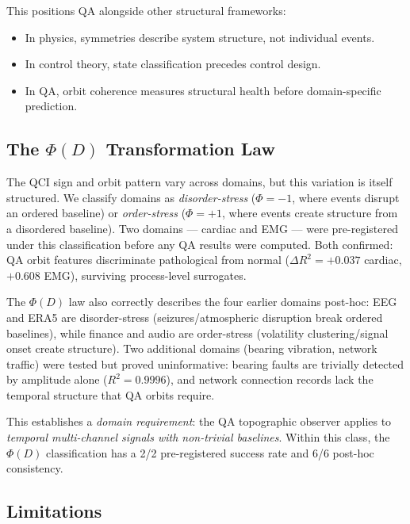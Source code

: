 \documentclass[11pt,a4paper]{article}
\begin{document}
This positions QA alongside other structural frameworks:
\begin{itemize}
  \item In physics, symmetries describe system structure, not individual events.
  \item In control theory, state classification precedes control design.
  \item In QA, orbit coherence measures structural health before
    domain-specific prediction.
\end{itemize}

\subsection{The $\Phi(D)$ Transformation Law}

The QCI sign and orbit pattern vary across domains, but this variation
is itself structured. We classify domains as \emph{disorder-stress}
($\Phi = -1$, where events disrupt an ordered baseline) or
\emph{order-stress} ($\Phi = +1$, where events create structure from
a disordered baseline). Two domains --- cardiac and EMG --- were
pre-registered under this classification before any QA results were
computed. Both confirmed: QA orbit features discriminate pathological
from normal ($\Delta R^2 = +0.037$ cardiac, $+0.608$ EMG), surviving
process-level surrogates.

The $\Phi(D)$ law also correctly describes the four earlier domains
post-hoc: EEG and ERA5 are disorder-stress (seizures/atmospheric
disruption break ordered baselines), while finance and audio are
order-stress (volatility clustering/signal onset create structure).
Two additional domains (bearing vibration, network traffic) were
tested but proved uninformative: bearing faults are trivially detected
by amplitude alone ($R^2 = 0.9996$), and network connection records
lack the temporal structure that QA orbits require.

This establishes a \emph{domain requirement}: the QA topographic observer
applies to \emph{temporal multi-channel signals with non-trivial baselines}.
Within this class, the $\Phi(D)$ classification has a 2/2 pre-registered
success rate and 6/6 post-hoc consistency.

\subsection{Limitations}
\end{document}
